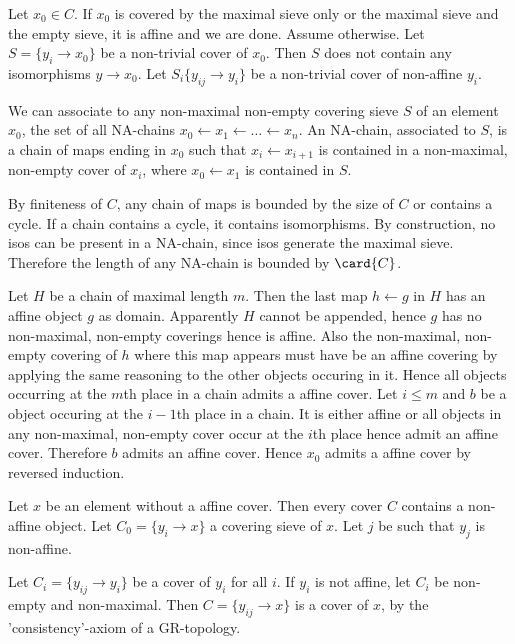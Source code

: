 



Let $x_0\in C$. 
If $x_0$ is covered by the maximal sieve only or the maximal sieve and the empty sieve, it is affine and we are done. 
Assume otherwise.
Let $S = \{y_i \rightarrow x_0\}$ be a non-trivial cover of $x_0$.
Then $S$ does not contain any isomorphisms $y\rightarrow x_0$.
Let $S_i\{y_{ij}\rightarrow y_i\}$ be a non-trivial cover of non-affine $y_i$.

We can associate to any non-maximal non-empty covering sieve $S$ of an element $x_0$,
the set of all NA-chains $x_0\leftarrow x_1 \leftarrow \ldots \leftarrow x_n$.
An NA-chain, associated to $S$, is a chain of maps ending in $x_0$ such that $x_i \leftarrow x_{i+1}$ is contained in a non-maximal, 
non-empty cover of $x_i$, where $x_0\leftarrow x_1$ is contained in $S$.

By finiteness of $C$, any chain of maps is bounded by the size of $C$ or contains a cycle. 
If a chain contains a cycle, it contains isomorphisms. 
By construction, no isos can be present in a NA-chain, since isos generate the maximal sieve. 
Therefore the length of any NA-chain is bounded by $\card{C}$.

Let $H$ be a chain of maximal length $m$. 
Then the last map $h \leftarrow g$ in $H$ has an affine object $g$ as domain.
Apparently $H$ cannot be appended, hence $g$ has no non-maximal, non-empty coverings hence is affine.
Also the non-maximal, non-empty covering of $h$ where this map appears must have be an affine covering by applying the same reasoning to the other objects occuring in it. 
Hence all objects occurring at the $m$th place in a chain admits a affine cover.
Let $i\leq m$ and $b$ be a object occuring at the $i-1$th place in a chain. 
It is either affine or all objects in any non-maximal, non-empty cover occur at the $i$th place hence admit an affine cover.
Therefore $b$ admits an affine cover. Hence $x_0$ admits a affine cover by reversed induction.




Let $x$ be an element without a affine cover.
Then every cover $C$ contains a non-affine object.
Let $C_0 = \{y_i\rightarrow x\}$ a covering sieve of $x$.
Let $j$ be such that $y_j$ is non-affine.

Let $C_i = \{y_{ij} \rightarrow y_i\}$ be a cover of $y_i$ for all $i$.
If $y_i$ is not affine, let $C_i$ be non-empty and non-maximal.
Then $C = \{y_{ij} \rightarrow x\}$ is a cover of $x$, by the 'consistency'-axiom of a GR-topology.


